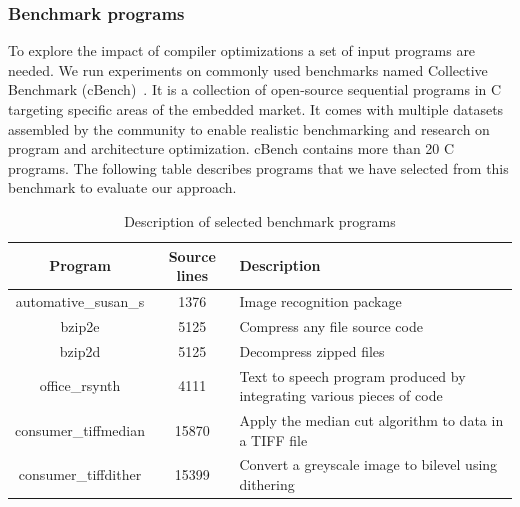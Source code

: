 \subsubsection{Benchmark programs}
To explore the impact of compiler optimizations a set of input programs are needed. We run experiments on commonly used benchmarks named Collective Benchmark (cBench)~\cite{fursin2009collective}. It is a collection of open-source sequential programs in C targeting specific areas of the embedded market. It comes with multiple datasets assembled by the community to enable realistic benchmarking and research on program and architecture optimization. cBench contains more than 20 C programs. The following table describes programs that we have selected from this benchmark to evaluate our approach.
\begin{table}[h]
	\begin{center}
		\begin{tabular}{|c|c|p{4cm}|}
			\hline
			\textbf{Program} & \textbf{Source lines} & \textbf{Description}\\
			\hline
			automative\_susan\_s & 1376 & Image recognition package\\
			\hline
			bzip2e & 5125 & Compress any file
			source code \\
			\hline
			bzip2d & 5125 & Decompress zipped files \\
			\hline
			office\_rsynth & 4111 & Text to speech program produced by integrating various pieces of code\\
			\hline
			consumer\_tiffmedian& 15870 & Apply the median cut algorithm to data in a TIFF file
			\\
			
			\hline
			 consumer\_tiffdither& 15399 & Convert a greyscale image to bilevel using dithering
			 \\
			\hline
			
		\end{tabular}
		
	\end{center}
	\caption {Description of selected benchmark programs}
\end{table}
